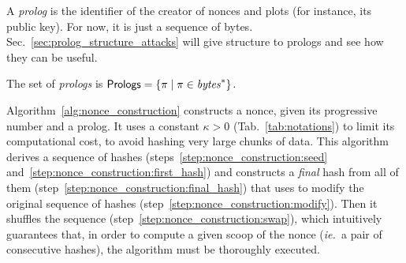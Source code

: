 A \emph{prolog} is the identifier of the creator of nonces and plots (for instance, its public key).
For now, it is just a sequence of bytes. Sec.~\ref{sec:prolog_structure_attacks}
will give structure to prologs and see how they can be useful.
%
\begin{definition}[Prolog]\label{def:prolog}
  The set of \emph{prologs} is ${\mathsf{Prologs}}=\{\pi\mid\pi\in\mathit{bytes}^*\}$.
\end{definition}
%
Algorithm~\ref{alg:nonce_construction} constructs a nonce,
given its progressive number and a prolog.
It uses a constant $\kappa>0$ (Tab.~\ref{tab:notations})
to limit its computational cost, to avoid hashing very large chunks of data.
This algorithm derives a sequence of hashes (steps~\ref{step:nonce_construction:seed}
and~\ref{step:nonce_construction:first_hash}) and constructs a \emph{final} hash from
all of them (step~\ref{step:nonce_construction:final_hash}) that uses to modify
the original sequence of hashes (step~\ref{step:nonce_construction:modify}).
Then it shuffles the sequence (step~\ref{step:nonce_construction:swap}), which intuitively
guarantees that, in order to compute a given scoop of the nonce
(\textit{ie.\ }a pair of consecutive hashes), the algorithm must be thoroughly executed.
%
